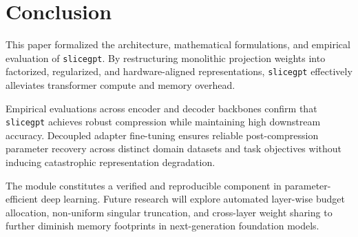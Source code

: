 \section{Conclusion}
This paper formalized the architecture, mathematical formulations, and empirical evaluation of \texttt{slicegpt}. By restructuring monolithic projection weights into factorized, regularized, and hardware-aligned representations, \texttt{slicegpt} effectively alleviates transformer compute and memory overhead.

Empirical evaluations across encoder and decoder backbones confirm that \texttt{slicegpt} achieves robust compression while maintaining high downstream accuracy. Decoupled adapter fine-tuning ensures reliable post-compression parameter recovery across distinct domain datasets and task objectives without inducing catastrophic representation degradation.

The module constitutes a verified and reproducible component in parameter-efficient deep learning. Future research will explore automated layer-wise budget allocation, non-uniform singular truncation, and cross-layer weight sharing to further diminish memory footprints in next-generation foundation models.
